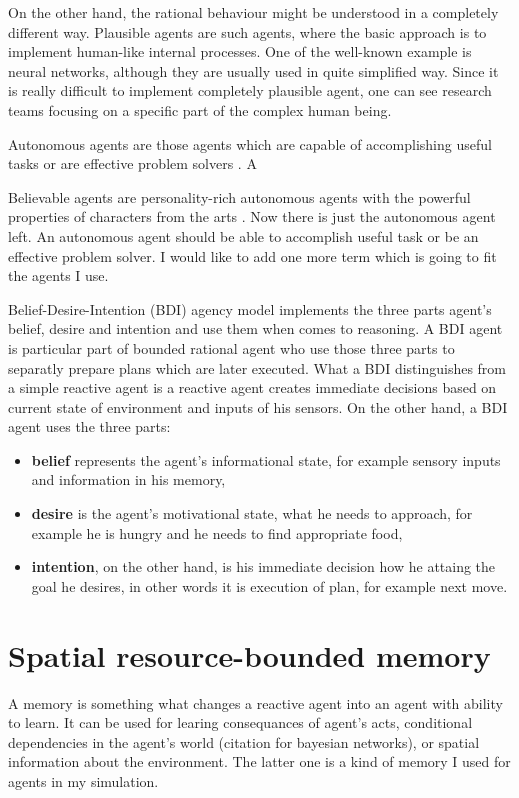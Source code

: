 On the other hand, the rational behaviour might be understood in a completely different way. Plausible agents are such agents, where the basic approach is to implement human-like internal processes. One of the well-known example is neural networks, although they are usually used in quite simplified way. Since it is really difficult to implement completely plausible agent, one can see research teams focusing on a specific part of the complex human being. 

Autonomous agents are those agents which are capable of accomplishing useful tasks or are effective problem solvers \cite{Loyall:believableagents}. A

Believable agents are personality-rich autonomous agents with the powerful properties of characters from the arts \cite{Loyall:believableagents}. Now there is just the autonomous agent left. An autonomous agent should be able to accomplish useful task or be an effective problem solver. I would like to add one more term which is going to fit the agents I use. 

Belief-Desire-Intention (BDI) agency model implements the three parts agent's belief, desire and intention and use them when comes to reasoning. A BDI agent is particular part of bounded rational agent who use those three parts to separatly prepare plans which are later executed. What a BDI distinguishes from a simple reactive agent is a reactive agent creates immediate decisions based on current state of environment and inputs of his sensors. On the other hand, a BDI agent uses the three parts:

\begin{itemize}
\item {\bf belief} represents the agent's informational state, for example sensory inputs and information in his memory,
\item {\bf desire} is the agent's motivational state, what he needs to approach, for example he is hungry and he needs to find appropriate food,
\item {\bf intention}, on the other hand, is his immediate decision how he attaing the goal he desires, in other words it is execution of plan, for example next move.
\end{itemize}

\section{Spatial resource-bounded memory}

A memory is something what changes a reactive agent into an agent with ability to learn. It can be used for learing consequances of agent's acts, conditional dependencies in the agent's world (citation for bayesian networks), or spatial information about the environment. The latter one is a kind of memory I used for agents in my simulation. 

